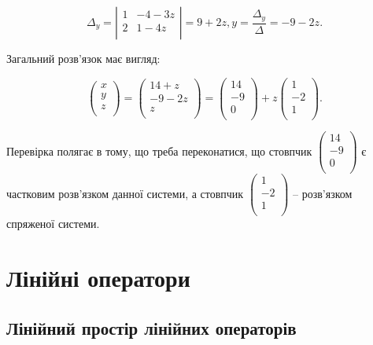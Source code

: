 $$\Delta_y = \left| \begin{matrix}
	1 & -4 -3z \\
	2 &  1 -4z \\
\end{matrix} \right| = 9 + 2z, y = \dfrac{\Delta_y}{\Delta} = -9 -2z.$$

Загальний розв’язок має вигляд:

$$\begin{pmatrix}
	x \\
	y \\
	z \\
\end{pmatrix} = \begin{pmatrix}
	14 + z \\
	-9 - 2z \\
	z \\
\end{pmatrix} = \begin{pmatrix}
	14 \\
	-9 \\
	 0 \\
\end{pmatrix} + z \begin{pmatrix}
	 1 \\
	-2 \\
	 1 \\
\end{pmatrix}.$$

Перевірка полягає в тому, що треба переконатися, що стовпчик $\begin{pmatrix}
	14 \\
	-9 \\
	 0 \\
\end{pmatrix}$ є
частковим розв’яз\-ком данної системи, а стовпчик $\begin{pmatrix}
	 1 \\
	-2 \\
	 1 \\
\end{pmatrix}$ -- розв’язком спряженої
системи. 


\section{Лінійні оператори}


\subsection{Лінійний простір лінійних операторів}

